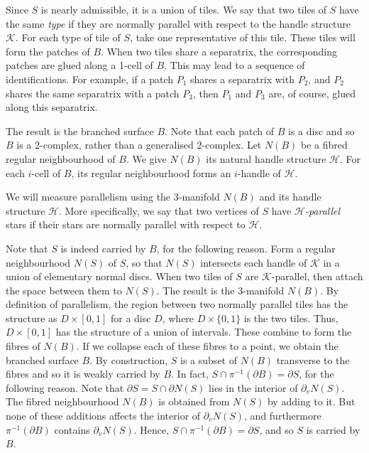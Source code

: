 \documentclass[oneside]{amsart}
\numberwithin{equation}{section}
\theoremstyle{plain}
\theoremstyle{definition}
\begin{document}
Since $S$ is nearly admissible, it is a union of tiles. We say that two tiles of $S$ have the same \emph{type}
if they are normally parallel with respect to the handle structure $\mathcal{K}$. 
For each type of tile of $S$, take one representative of this tile. These tiles will
form the patches of $B$. When two tiles share a separatrix,
the corresponding patches are glued along a 1-cell of $B$. 
This may lead to a sequence of identifications.
For example, if a patch $P_1$ shares a separatrix with $P_2$, and $P_2$ shares the same separatrix with a patch $P_3$,
then $P_1$ and $P_3$ are, of course, glued along this separatrix.

The result is the branched surface $B$. Note that each patch of $B$ is a disc
and so $B$ is a 2-complex, rather than a generalised 2-complex. Let $N(B)$ be a fibred regular neighbourhood of $B$.
We give $N(B)$ its natural handle structure $\mathcal{H}$.
For each $i$-cell of $B$, its regular neighbourhood forms an $i$-handle of $\mathcal{H}$.

We will measure parallelism using the 3-manifold $N(B)$ and its handle structure $\mathcal{H}$. 
More specifically, we say that two vertices of $S$ have \emph{$\mathcal{H}$-parallel} stars 
if their stars are normally parallel with respect to $\mathcal{H}$.

Note that $S$ is indeed carried by $B$, for the following reason. Form a regular neighbourhood
$N(S)$ of $S$, so that $N(S)$ intersects each handle of $\mathcal{K}$ in a union of
elementary normal discs. When two tiles of $S$ are $\mathcal{K}$-parallel,
then attach the space between them to $N(S)$. The result is the 3-manifold $N(B)$.
By definition of parallelism, the region between two normally parallel tiles
has the structure as $D \times [0,1]$ for a disc $D$, where $D \times \{ 0,1 \}$
is the two tiles. Thus, $D \times [0,1]$ has the structure of a union of intervals.
These combine to form the fibres of $N(B)$. If we collapse each of these fibres to
a point, we obtain the branched surface $B$. By construction, $S$ is a subset
of $N(B)$ transverse to the fibres and so it is weakly carried by $B$. In fact, $S \cap \pi^{-1}(\partial B) = \partial S$,
for the following reason. Note that $\partial S = S \cap \partial N(S)$ lies in the interior of $\partial_v N(S)$. The fibred
neighbourhood $N(B)$ is obtained from $N(S)$ by adding to it. But none of these additions affects
the interior of $\partial_v N(S)$, and furthermore $\pi^{-1}(\partial B)$ contains $\partial_v N(S)$.
Hence, $S \cap \pi^{-1}(\partial B) = \partial S$, and so $S$ is carried by $B$.
\end{document}
